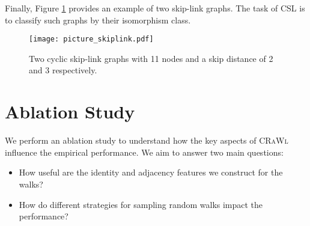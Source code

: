 \documentclass{scrartcl} \usepackage[dvipsnames]{xcolor}
\newcommand{\crawl}{\textsc{CRaWl}}
\begin{document}
Finally, Figure \ref{fig:skiplink} provides an example of two skip-link graphs.
The task of CSL is to classify such graphs by their isomorphism class.
\begin{figure}
    \centering
\texttt{[image: picture\_skiplink.pdf]}
    \caption{Two cyclic skip-link graphs \citep[see][]{murphy2019relational} \textbf{}with 11 nodes and a skip distance of 2 and 3 respectively.}
    \label{fig:skiplink}
\end{figure}     \section{Ablation Study}
\label{ablation study}
\begin{table*}[t]
\caption{Results of our ablation study. Node features , edge features , adjacency encoding , and identity encoding . Walk strategies no-backtrack (NB) and uniform (UN).}
\label{ablation_results}
\begin{center}
\end{center}
\vskip -0.1in
\end{table*} We perform an ablation study to understand how the key aspects of \crawl{} influence the empirical performance.
We aim to answer two main questions:
\begin{itemize}
    \item How useful are the identity and adjacency features we construct for the walks?
    \item How do different strategies for sampling random walks impact the performance?
\end{itemize}
\end{document}
